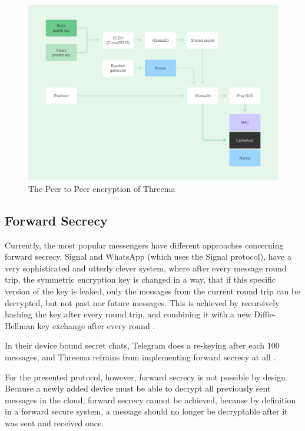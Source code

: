 \documentclass[a4paper, oneside]{discothesis}
\begin{document}
\begin{figure}[h!]
    \centering
    \includegraphics[width=\columnwidth]{figures/threema.png}
    \caption{The Peer to Peer encryption of Threema}
    \label{fig:peer_encryption}
\end{figure}

\subsection{Forward Secrecy}
\label{sec:forward_secrecy}

Currently, the most popular messengers have different approaches concerning forward secrecy. Signal and WhatsApp  (which uses the Signal protocol), have a very sophisticated and utterly clever system, where after every message round trip, the symmetric encryption key is changed in a way, that if this specific version of the key is leaked, only the messages from the current round trip can be decrypted, but not past nor future messages. This is achieved by recursively hashing the key after every round trip, and combining it with a new Diffie-Hellman key exchange after every round \cite{DoubleRatchet}.

In their device bound secret chats, Telegram does a re-keying after each 100 messages, and Threema refrains from implementing forward secrecy at all \cite{Threema}.

For the presented protocol, however, forward secrecy is not possible by design. Because a newly added device must be able to decrypt all previously sent messages in the cloud, forward secrecy cannot be achieved, because by definition in a forward secure system, a message should no longer be decryptable after it was sent and received once.
\end{document}
